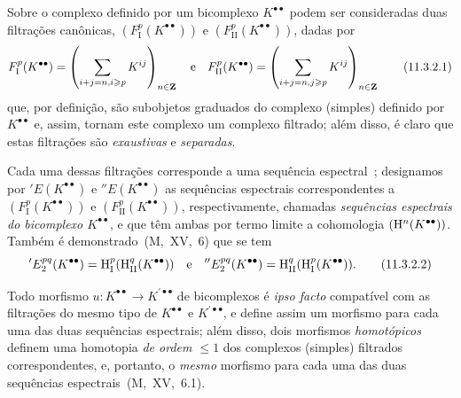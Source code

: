 \begin{env}[11.3.2]
\label{0.11.3.2}
Sobre o complexo definido por um bicomplexo $K^{\bullet\bullet}$ podem ser consideradas duas filtrações canônicas, $(F_\mathrm{I}^p(K^{\bullet\bullet}))$ e $(F_\mathrm{II}^p(K^{\bullet\bullet}))$, dadas por
\[
\label{0.11.3.2.1}
  F_\mathrm{I}^p(K^{\bullet\bullet})
  = \left(\sum_{i+j=n,i\geq p}K^{ij}\right)_{n\in\bb{Z}}
  \quad\text{e}\quad
  F_\mathrm{II}^p(K^{\bullet\bullet})
  = \left(\sum_{i+j=n,j\geq p}K^{ij}\right)_{n\in\bb{Z}}
  \tag{11.3.2.1}
\]
que, por definição, são subobjetos graduados do complexo (simples) definido por $K^{\bullet\bullet}$ e, assim, tornam este complexo um complexo filtrado;
além disso, é claro que estas filtrações são \emph{exaustivas} e \emph{separadas}.

Cada uma dessas filtrações corresponde a uma sequência espectral~;
designamos por $'E(K^{\bullet\bullet})$ e $''E(K^{\bullet\bullet})$ as sequências espectrais correspondentes a $(F_\mathrm{I}^p(K^{\bullet\bullet}))$ e $(F_\mathrm{II}^p(K^{\bullet\bullet}))$, respectivamente, chamadas \emph{sequências espectrais do bicomplexo $K^{\bullet\bullet}$}, e que têm ambas por termo limite a cohomologia $(\mathrm{H}^n(K^{\bullet\bullet}))$.
Também é demonstrado~(M,~XV,~6) que se tem
\[
\label{0.11.3.2.2}
  'E_2^{pq}(K^{\bullet\bullet})
  = \HH_\mathrm{I}^p(\HH_\mathrm{II}^q(K^{\bullet\bullet}))
  \quad\text{e}\quad
  ''E_2^{pq}(K^{\bullet\bullet})
  = \HH_\mathrm{II}^q(\HH_\mathrm{I}^p(K^{\bullet\bullet})).
  \tag{11.3.2.2}
\]

Todo morfismo $u:K^{\bullet\bullet}\to K^{\prime\bullet\bullet}$ de bicomplexos é \emph{ipso facto} compatível com as filtrações do mesmo tipo de $K^{\bullet\bullet}$ e $K^{\prime\bullet\bullet}$, e define assim um morfismo para cada uma das duas sequências espectrais;
além disso, dois morfismos \emph{homotópicos} definem uma homotopia \emph{de ordem $\leq 1$} dos complexos (simples) filtrados correspondentes, e, portanto, o \emph{mesmo} morfismo para cada uma das duas sequências espectrais~(M,~XV,~6.1).
\end{env}

